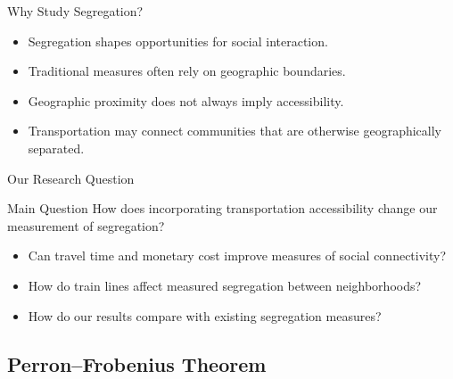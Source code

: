 \documentclass[aspectratio=169,10pt]{beamer}
\begin{document}
\begin{frame}[shrink=0]{Why Study Segregation?}
    \begin{itemize}
        \item Segregation shapes opportunities for
        social interaction.

        \item Traditional measures often rely on
        geographic boundaries.

        \item Geographic proximity does not always
        imply accessibility.

        \item Transportation may connect communities
        that are otherwise geographically separated.
    \end{itemize}
\end{frame}

\begin{frame}[shrink=0]{Our Research Question}
    \begin{block}{Main Question}
        How does incorporating transportation
        accessibility change our measurement
        of segregation?
    \end{block}

    \vspace{0.3cm}

    \begin{itemize}
        \item Can travel time and monetary cost
        improve measures of social connectivity?

        \item How do train lines affect measured
        segregation between neighborhoods?

        \item How do our results compare with
        existing segregation measures?
    \end{itemize}
\end{frame}




\subsection{Perron--Frobenius Theorem}
\end{document}
